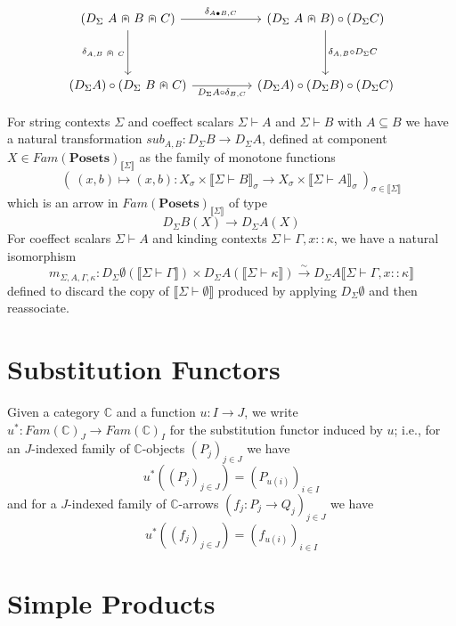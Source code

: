 \documentclass{article}
\newcommand{\mbf}{\mathbf}
\newcommand{\sem}[1]{\llbracket #1 \rrbracket}
\newcommand{\capdot}{~\stackinset{c}{}{c}{}{\scalebox{0.8}{$\ast$}}{$\cap$}~}
\newcommand{\sdisp}[1]{
\left( #1 \right)
}
\begin{document}
\[\begin{tikzcd}
	{(D_{\Sigma}~A \capdot B \capdot C)} && {(D_{\Sigma}~A \capdot B) \circ (D_{\Sigma} C)} \\
	\\
	{(D_{\Sigma} A) \circ (D_{\Sigma}~B \capdot C)} && {(D_{\Sigma} A) \circ (D_{\Sigma} B) \circ (D_{\Sigma} C)}
	\arrow["{\delta_{A, B \capdot C}}"', from=1-1, to=3-1]
	\arrow["{D_{\Sigma} A \circ \delta_{B,C}}"', from=3-1, to=3-3]
	\arrow["{\delta_{A \bullet B, C}}", from=1-1, to=1-3]
	\arrow["{\delta_{A,B} \circ D_{\Sigma} C}", from=1-3, to=3-3]
\end{tikzcd}\]

For string contexts $\Sigma$ and coeffect scalars $\Sigma \vdash A$ and $\Sigma \vdash B$ with $A \subseteq B$ we have a natural transformation $\mathit{sub}_{A,B} : D_{\Sigma} B \to D_{\Sigma } A$, defined at component $X \in \mathit{Fam}(\mbf{Posets})_{\sem{\Sigma}}$ as the family of monotone functions $$(~(x,b) \mapsto (x,b) : X_\sigma \times \sem{\Sigma \vdash B}_\sigma \to X_{\sigma} \times \sem{\Sigma \vdash A}_{\sigma}~)_{\sigma \in \sem{\Sigma}}$$
which is an arrow in $\mathit{Fam}(\mbf{Posets})_{\sem{\Sigma}}$ of type $$D_{\Sigma}B(X) \to D_{\Sigma}A(X)$$
For coeffect scalars $\Sigma \vdash A$ and kinding contexts $\Sigma \vdash \Gamma,x :: \kappa$, we have a natural isomorphism $$m_{\Sigma,A,\Gamma,\kappa} : D_{\Sigma} \emptyset(\sem{\Sigma \vdash \Gamma}) \times D_{\Sigma} A( \sem{\Sigma \vdash \kappa} ) \overset{\sim}{\to} D_{\Sigma} A \sem{\Sigma \vdash \Gamma,x :: \kappa}$$ defined to discard the copy of $\sem{\Sigma \vdash \emptyset}$ produced by applying $D_{\Sigma} \emptyset$ and then reassociate.

\section*{Substitution Functors}

Given a category $\mathbb C$ and a function $u : I \to J$, we write $u^* : \mathit{Fam}(\mbf{\mathbb C})_J \to \mathit{Fam}(\mathbb C)_I$ for the substitution functor induced by $u$; i.e., for an $J$-indexed family of $\mathbb C$-objects $\sdisp{P_j}_{j \in J}$ we have $$u^* (\sdisp{P_j}_{j \in J}) = \sdisp{ P_{u(i)} }_{i \in I}$$ and for a $J$-indexed family of $\mathbb C$-arrows $(f_j : P_j \to Q_j)_{j \in J}$ we have $$u^*(\sdisp{f_j}_{j \in J}) = \sdisp{f_{u(i)}}_{i \in I}$$

\section*{Simple Products}
\end{document}
